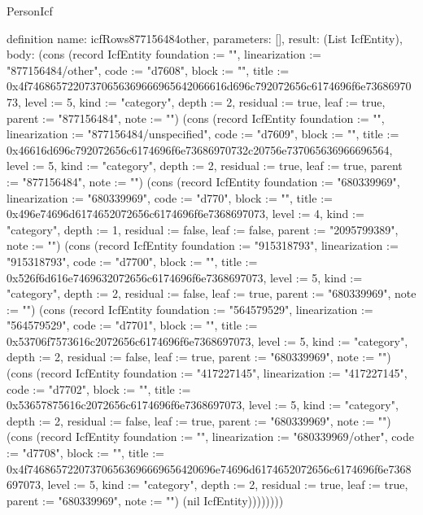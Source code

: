 \begin{lexlean}{PersonIcf}
\begin{semanticmodule}
definition{
  name: icfRows877156484other,
  parameters: [],
  result: (List IcfEntity),
  body: (cons (record IcfEntity {foundation := "", linearization := "877156484/other", code := "d7608", block := "", title := 0x4f74686572207370656369666965642066616d696c792072656c6174696f6e7368697073, level := 5, kind := "category", depth := 2, residual := true, leaf := true, parent := "877156484", note := ""}) (cons (record IcfEntity {foundation := "", linearization := "877156484/unspecified", code := "d7609", block := "", title := 0x46616d696c792072656c6174696f6e73686970732c20756e737065636966696564, level := 5, kind := "category", depth := 2, residual := true, leaf := true, parent := "877156484", note := ""}) (cons (record IcfEntity {foundation := "680339969", linearization := "680339969", code := "d770", block := "", title := 0x496e74696d6174652072656c6174696f6e7368697073, level := 4, kind := "category", depth := 1, residual := false, leaf := false, parent := "2095799389", note := ""}) (cons (record IcfEntity {foundation := "915318793", linearization := "915318793", code := "d7700", block := "", title := 0x526f6d616e7469632072656c6174696f6e7368697073, level := 5, kind := "category", depth := 2, residual := false, leaf := true, parent := "680339969", note := ""}) (cons (record IcfEntity {foundation := "564579529", linearization := "564579529", code := "d7701", block := "", title := 0x53706f7573616c2072656c6174696f6e7368697073, level := 5, kind := "category", depth := 2, residual := false, leaf := true, parent := "680339969", note := ""}) (cons (record IcfEntity {foundation := "417227145", linearization := "417227145", code := "d7702", block := "", title := 0x53657875616c2072656c6174696f6e7368697073, level := 5, kind := "category", depth := 2, residual := false, leaf := true, parent := "680339969", note := ""}) (cons (record IcfEntity {foundation := "", linearization := "680339969/other", code := "d7708", block := "", title := 0x4f746865722073706563696669656420696e74696d6174652072656c6174696f6e7368697073, level := 5, kind := "category", depth := 2, residual := true, leaf := true, parent := "680339969", note := ""}) (nil IcfEntity))))))))
}


\end{semanticmodule}
\end{lexlean}
